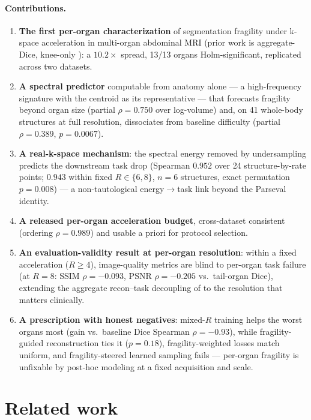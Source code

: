 \documentclass[10pt,twocolumn,letterpaper]{article}
\begin{document}
\paragraph{Contributions.}
\begin{enumerate}
  \item \textbf{The first per-organ characterization} of segmentation fragility under k-space acceleration in multi-organ abdominal MRI (prior work is aggregate-Dice, knee-only \cite{morshuis2025,tolpadi2023}): a $10.2\times$ spread, 13/13 organs Holm-significant, replicated across two datasets.
  \item \textbf{A spectral predictor} computable from anatomy alone --- a high-frequency signature with the centroid as its representative --- that forecasts fragility beyond organ size (partial $\rho{=}0.750$ over log-volume) and, on 41 whole-body structures at full resolution, dissociates from baseline difficulty (partial $\rho{=}0.389$, $p{=}0.0067$).
  \item \textbf{A real-k-space mechanism}: the spectral energy removed by undersampling predicts the downstream task drop (Spearman $0.952$ over 24 structure-by-rate points; $0.943$ within fixed $R{\in}\{6,8\}$, $n{=}6$ structures, exact permutation $p{=}0.008$) --- a non-tautological energy$\rightarrow$task link beyond the Parseval identity.
  \item \textbf{A released per-organ acceleration budget}, cross-dataset consistent (ordering $\rho{=}0.989$) and usable a priori for protocol selection.
  \item \textbf{An evaluation-validity result at per-organ resolution}: within a fixed acceleration ($R\geq4$), image-quality metrics are blind to per-organ task failure (at $R{=}8$: SSIM $\rho{=}-0.093$, PSNR $\rho{=}-0.205$ vs.\ tail-organ Dice), extending the aggregate recon--task decoupling of \cite{morshuis2025,tolpadi2023} to the resolution that matters clinically.
  \item \textbf{A prescription with honest negatives}: mixed-$R$ training helps the worst organs most (gain vs.\ baseline Dice Spearman $\rho{=}-0.93$), while fragility-guided reconstruction ties it ($p{=}0.18$), fragility-weighted losses match uniform, and fragility-steered learned sampling fails --- per-organ fragility is unfixable by post-hoc modeling at a fixed acquisition and scale.
\end{enumerate}

\section{Related work}
\label{sec:related}
\end{document}
